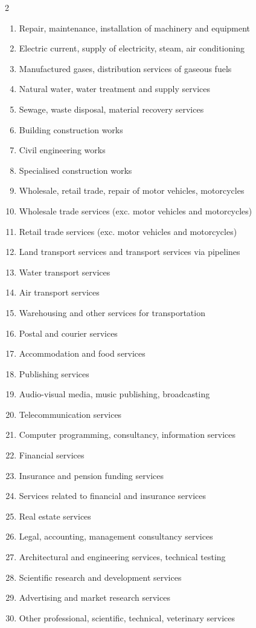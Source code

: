 \documentclass{article}
\begin{document}
\begin{multicols}{2}
\begin{enumerate}[leftmargin=*,itemsep=0pt,parsep=0pt]
\item Repair, maintenance, installation of machinery and equipment
\item Electric current, supply of electricity, steam, air conditioning
\item Manufactured gases, distribution services of gaseous fuels
\item Natural water, water treatment and supply services
\item Sewage, waste disposal, material recovery services
\item Building construction works
\item Civil engineering works
\item Specialised construction works
\item Wholesale, retail trade, repair of motor vehicles, motorcycles
\item Wholesale trade services (exc. motor vehicles and motorcycles)
\item Retail trade services (exc. motor vehicles and motorcycles)
\item Land transport services and transport services via pipelines
\item Water transport services
\item Air transport services
\item Warehousing and other services for transportation
\item Postal and courier services
\item Accommodation and food services
\item Publishing services
\item Audio-visual media, music publishing, broadcasting
\item Telecommunication services
\item Computer programming, consultancy, information services
\item Financial services
\item Insurance and pension funding services
\item Services related to financial and insurance services
\item Real estate services
\item Legal, accounting, management consultancy services
\item Architectural and engineering services, technical testing
\item Scientific research and development services
\item Advertising and market research services
\item Other professional, scientific, technical, veterinary services

\end{enumerate}
\end{multicols}
\end{document}

